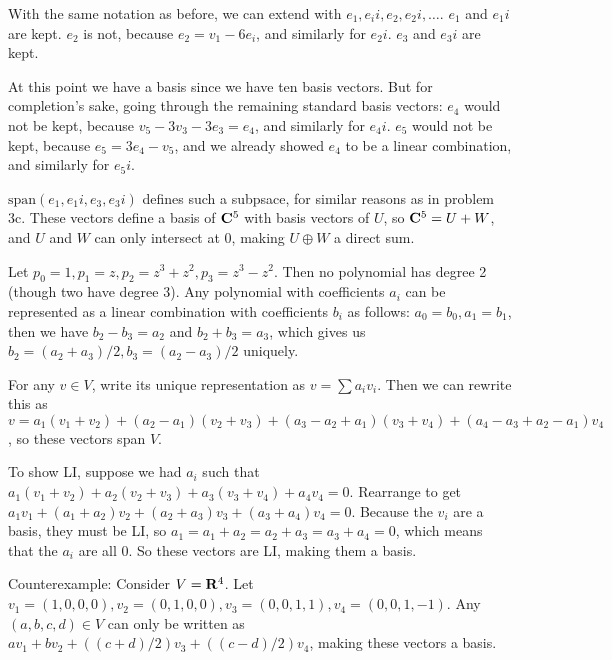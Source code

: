 \documentclass{article}
\begin{document}

With the same notation as before, we can extend with $e_1, e_ii, e_2, e_2i,
\ldots$. $e_1$ and $e_1i$ are kept. $e_2$ is not, because $e_2 = v_1 - 6e_i$,
and similarly for $e_2i$. $e_3$ and $e_3i$ are kept.

At this point we have a basis since we have ten basis vectors. But for
completion's sake, going through the remaining standard basis vectors: $e_4$
would not be kept, because $v_5 - 3v_3 - 3e_3 = e_4$, and similarly for $e_4i$.
$e_5$ would not be kept, because $e_5 = 3e_4 - v_5$, and we already showed $e_4$
to be a linear combination, and similarly for $e_5i$.


$\text{span}(e_1, e_1i, e_3, e_3i)$ defines such a subpsace, for similar reasons
as in problem 3c. These vectors define a basis of $\mathbf{C}^5$ with basis
vectors of $U$, so $\mathbf{C}^5 = U + W$, and $U$ and $W$ can only intersect at
0, making $U \oplus W$ a direct sum.


Let $p_0 = 1, p_1 = z, p_2 = z^3 + z^2, p_3 = z^3 - z^2$. Then no polynomial has
degree 2 (though two have degree 3). Any polynomial with coefficients $a_i$ can
be represented as a linear combination with coefficients $b_i$ as follows: $a_0
= b_0, a_1 = b_1$, then we have $b_2 - b_3 = a_2$ and $b_2 + b_3 = a_3$, which
gives us $b_2 = (a_2 + a_3)/2, b_3 = (a_2 - a_3)/2$ uniquely.


For any $v \in V$, write its unique representation as $v = \sum a_iv_i$. Then we
can rewrite this as $v = a_1(v_1 + v_2) + (a_2 - a_1)(v_2 + v_3) + (a_3 - a_2 +
a_1)(v_3 + v_4) + (a_4 - a_3 + a_2 - a_1)v_4$, so these vectors span $V$.

To show LI, suppose we had $a_i$ such that $a_1(v_1 + v_2) + a_2(v_2 + v_3) +
a_3(v_3 + v_4) + a_4v_4 = 0$. Rearrange to get $a_1v_1 + (a_1 + a_2)v_2 + (a_2 +
a_3)v_3 + (a_3 + a_4)v_4 = 0$. Because the $v_i$ are a basis, they must be LI,
so $a_1 = a_1 + a_2 = a_2 + a_3 = a_3 + a_4 = 0$, which means that the $a_i$ are
all 0. So these vectors are LI, making them a basis.


Counterexample: Consider $V = \mathbf{R}^4$. Let $v_1 = (1,0,0,0), v_2 = (0,1,0,0),
v_3 = (0,0,1,1), v_4 = (0,0,1,-1)$. Any $(a,b,c,d) \in V$ can only be written as
$av_1 + bv_2 + ((c+d)/2)v_3 + ((c-d)/2)v_4$, making these vectors a basis.
\end{document}
